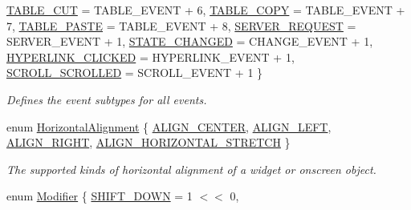 \begin{DoxyCompactItemize}
\mbox{\hyperlink{namespacesgl_a2628ea8d12e8b2563c32f05dc7fff6faadf55fee0a03951800e91c8ed529791cf}{T\+A\+B\+L\+E\+\_\+\+C\+UT}} = T\+A\+B\+L\+E\+\_\+\+E\+V\+E\+NT + 6, 
\mbox{\hyperlink{namespacesgl_a2628ea8d12e8b2563c32f05dc7fff6faa131383cfba94a4d73c7b36d7685b8fb6}{T\+A\+B\+L\+E\+\_\+\+C\+O\+PY}} = T\+A\+B\+L\+E\+\_\+\+E\+V\+E\+NT + 7, 
\mbox{\hyperlink{namespacesgl_a2628ea8d12e8b2563c32f05dc7fff6faa22252d1f99911e2e653a7e42de6016cc}{T\+A\+B\+L\+E\+\_\+\+P\+A\+S\+TE}} = T\+A\+B\+L\+E\+\_\+\+E\+V\+E\+NT + 8, 
\mbox{\hyperlink{namespacesgl_a2628ea8d12e8b2563c32f05dc7fff6faafd26eef4b610be4b7be12133e8ea1839}{S\+E\+R\+V\+E\+R\+\_\+\+R\+E\+Q\+U\+E\+ST}} = S\+E\+R\+V\+E\+R\+\_\+\+E\+V\+E\+NT + 1, 
\mbox{\hyperlink{namespacesgl_a2628ea8d12e8b2563c32f05dc7fff6faab8211e270fc50a097b2f6013e6c20a7a}{S\+T\+A\+T\+E\+\_\+\+C\+H\+A\+N\+G\+ED}} = C\+H\+A\+N\+G\+E\+\_\+\+E\+V\+E\+NT + 1, 
\mbox{\hyperlink{namespacesgl_a2628ea8d12e8b2563c32f05dc7fff6faabb784d1719314f71b66e20c5bec7e6ff}{H\+Y\+P\+E\+R\+L\+I\+N\+K\+\_\+\+C\+L\+I\+C\+K\+ED}} = H\+Y\+P\+E\+R\+L\+I\+N\+K\+\_\+\+E\+V\+E\+NT + 1, 
\mbox{\hyperlink{namespacesgl_a2628ea8d12e8b2563c32f05dc7fff6faaf857565304cfa8e0855f193c3ded3b04}{S\+C\+R\+O\+L\+L\+\_\+\+S\+C\+R\+O\+L\+L\+ED}} = S\+C\+R\+O\+L\+L\+\_\+\+E\+V\+E\+NT + 1
 \}
\begin{DoxyCompactList}\small\item\em Defines the event subtypes for all events. \end{DoxyCompactList}\item 
enum \mbox{\hyperlink{namespacesgl_aa00e70829e72ff16addc4d9f06fe3bc5}{Horizontal\+Alignment}} \{ \mbox{\hyperlink{namespacesgl_aa00e70829e72ff16addc4d9f06fe3bc5a5624165187e56db612253e608a45b1c6}{A\+L\+I\+G\+N\+\_\+\+C\+E\+N\+T\+ER}}, 
\mbox{\hyperlink{namespacesgl_aa00e70829e72ff16addc4d9f06fe3bc5a6ec599857e15466988726932dd592305}{A\+L\+I\+G\+N\+\_\+\+L\+E\+FT}}, 
\mbox{\hyperlink{namespacesgl_aa00e70829e72ff16addc4d9f06fe3bc5a9c81840e8cad46418b39a8b74a246354}{A\+L\+I\+G\+N\+\_\+\+R\+I\+G\+HT}}, 
\mbox{\hyperlink{namespacesgl_aa00e70829e72ff16addc4d9f06fe3bc5a87075ab721a5d866f71f5eea00190195}{A\+L\+I\+G\+N\+\_\+\+H\+O\+R\+I\+Z\+O\+N\+T\+A\+L\+\_\+\+S\+T\+R\+E\+T\+CH}}
 \}
\begin{DoxyCompactList}\small\item\em The supported kinds of horizontal alignment of a widget or onscreen object. \end{DoxyCompactList}\item 
enum \mbox{\hyperlink{namespacesgl_a80f90997871cd543ddb0bf8d282becdd}{Modifier}} \{ \mbox{\hyperlink{namespacesgl_a80f90997871cd543ddb0bf8d282becdda1c269f8d04b2612b64072ce4a2e59af2}{S\+H\+I\+F\+T\+\_\+\+D\+O\+WN}} = 1 $<$$<$ 0, 
$$
\end{DoxyCompactItemize}
